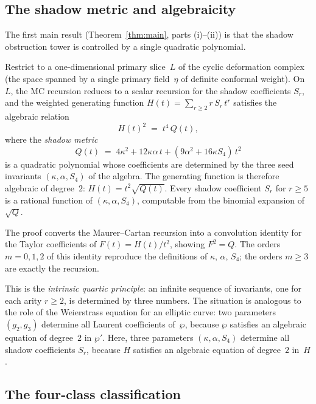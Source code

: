 \documentclass[11pt,reqno]{amsart}
\theoremstyle{definition}
\theoremstyle{remark}
\numberwithin{equation}{section}
\begin{document}
\subsection{The shadow metric and algebraicity}

The first main result (Theorem~\ref{thm:main}, parts (i)--(ii))
is that the shadow obstruction tower is controlled by a single quadratic
polynomial.

Restrict to a one-dimensional primary slice~$L$ of the
cyclic deformation complex (the space spanned by a single primary
field~$\eta$ of definite conformal weight). On~$L$, the
MC recursion reduces to a scalar recursion for the shadow
coefficients $S_r$, and the weighted generating function
$H(t) = \sum_{r \ge 2} r\,S_r\,t^r$ satisfies the algebraic
relation
\begin{equation}\label{eq:intro-algebraic}
 H(t)^2 \;=\; t^4\,Q(t),
\end{equation}
where the \emph{shadow metric}
\begin{equation}\label{eq:intro-shadow-metric}
 Q(t)
 \;=\;
 4\kappa^2 + 12\kappa\alpha\,t
 + (9\alpha^2 + 16\kappa S_4)\,t^2
\end{equation}
is a quadratic polynomial whose coefficients are determined by the
three seed invariants $(\kappa, \alpha, S_4)$ of the algebra.
The generating function is therefore algebraic of degree~$2$:
$H(t) = t^2 \sqrt{Q(t)}$. Every shadow coefficient $S_r$
for $r \ge 5$ is a rational function of $(\kappa, \alpha, S_4)$,
computable from the binomial expansion of~$\sqrt{Q}$.

The proof converts the Maurer--Cartan recursion into a convolution
identity for the Taylor coefficients of $F(t) = H(t)/t^2$,
showing $F^2 = Q$. The orders $m = 0, 1, 2$ of this identity
reproduce the definitions of $\kappa$, $\alpha$, $S_4$; the
orders $m \ge 3$ are exactly the recursion.

This is the \emph{intrinsic quartic principle}: an infinite
sequence of invariants, one for each arity $r \ge 2$, is
determined by three numbers. The situation is analogous to the
role of the Weierstrass equation for an elliptic curve: two
parameters $(g_2, g_3)$ determine all Laurent coefficients
of~$\wp$, because $\wp$ satisfies an algebraic equation of
degree~$2$ in $\wp'$. Here, three parameters
$(\kappa, \alpha, S_4)$ determine all shadow coefficients
$S_r$, because $H$ satisfies an algebraic equation of
degree~$2$ in~$H$.

\subsection{The four-class classification}
\end{document}
